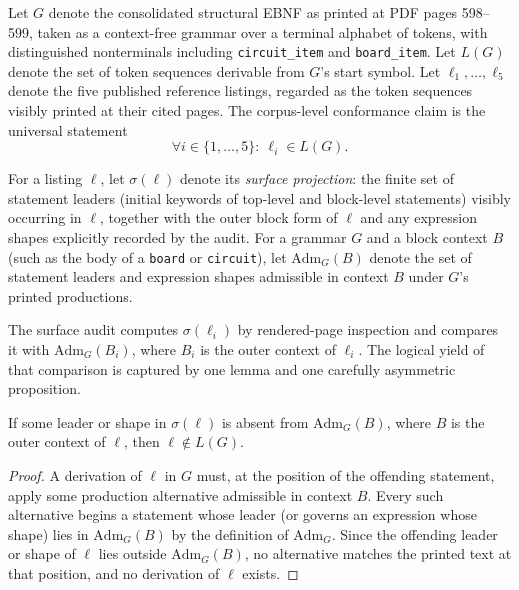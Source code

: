 \begin{notation}\label{ch10:not-grammar}
Let $G$ denote the consolidated structural EBNF as printed at PDF pages 598--599, taken as a context-free grammar over a terminal alphabet of tokens, with distinguished nonterminals including \texttt{circuit\_item} and \texttt{board\_item}. Let $L(G)$ denote the set of token sequences derivable from $G$'s start symbol. Let $\ell_1,\ldots,\ell_5$ denote the five published reference listings, regarded as the token sequences visibly printed at their cited pages. The corpus-level conformance claim is the universal statement
\[
\forall i\in\{1,\ldots,5\}:\ \ell_i\in L(G).
\]
\end{notation}

\begin{definition}\label{ch10:def-surface}
For a listing $\ell$, let $\sigma(\ell)$ denote its \emph{surface projection}: the finite set of statement leaders (initial keywords of top-level and block-level statements) visibly occurring in $\ell$, together with the outer block form of $\ell$ and any expression shapes explicitly recorded by the audit. For a grammar $G$ and a block context $B$ (such as the body of a \texttt{board} or \texttt{circuit}), let $\mathrm{Adm}_G(B)$ denote the set of statement leaders and expression shapes admissible in context $B$ under $G$'s printed productions.
\end{definition}

The surface audit computes $\sigma(\ell_i)$ by rendered-page inspection and compares it with $\mathrm{Adm}_G(B_i)$, where $B_i$ is the outer context of $\ell_i$. The logical yield of that comparison is captured by one lemma and one carefully asymmetric proposition.

\begin{lemma}\label{ch10:lem-refute}
If some leader or shape in $\sigma(\ell)$ is absent from $\mathrm{Adm}_G(B)$, where $B$ is the outer context of $\ell$, then $\ell\notin L(G)$.
\end{lemma}

\begin{proof}
A derivation of $\ell$ in $G$ must, at the position of the offending statement, apply some production alternative admissible in context $B$. Every such alternative begins a statement whose leader (or governs an expression whose shape) lies in $\mathrm{Adm}_G(B)$ by the definition of $\mathrm{Adm}_G$. Since the offending leader or shape of $\ell$ lies outside $\mathrm{Adm}_G(B)$, no alternative matches the printed text at that position, and no derivation of $\ell$ exists.
\end{proof}

